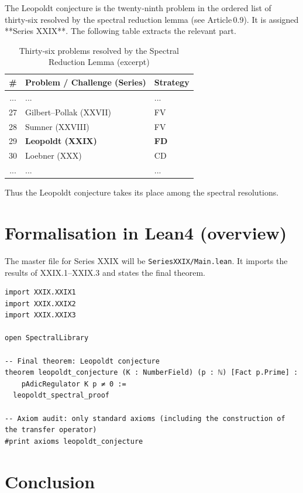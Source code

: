\documentclass[11pt,a4paper]{article}
\begin{document}
The Leopoldt conjecture is the twenty‑ninth problem in the ordered list of thirty‑six resolved by the spectral reduction lemma (see Article 0.9). It is assigned **Series XXIX**. The following table extracts the relevant part.

\begin{center}
\begin{longtable}{@{}cll@{}}
\caption{Thirty‑six problems resolved by the Spectral Reduction Lemma (excerpt)}\\
\toprule
\# & Problem / Challenge (Series) & Strategy \\
\midrule
... & ... & ... \\
27 & Gilbert–Pollak (XXVII) & FV \\
28 & Sumner (XXVIII) & FV \\
29 & \textbf{Leopoldt (XXIX)} & \textbf{FD} \\
30 & Loebner (XXX) & CD \\
... & ... & ... \\
\bottomrule
\end{longtable}
\end{center}

Thus the Leopoldt conjecture takes its place among the spectral resolutions.

\section{Formalisation in Lean4 (overview)}

The master file for Series XXIX will be \texttt{SeriesXXIX/Main.lean}. It imports the results of XXIX.1–XXIX.3 and states the final theorem.

\begin{lstlisting}[style=lean, caption={MainXXIX.lean (sketch)}]
import XXIX.XXIX1
import XXIX.XXIX2
import XXIX.XXIX3

open SpectralLibrary

-- Final theorem: Leopoldt conjecture
theorem leopoldt_conjecture (K : NumberField) (p : ℕ) [Fact p.Prime] :
    pAdicRegulator K p ≠ 0 :=
  leopoldt_spectral_proof

-- Axiom audit: only standard axioms (including the construction of the transfer operator)
#print axioms leopoldt_conjecture
\end{lstlisting}

\section{Conclusion}
\end{document}
